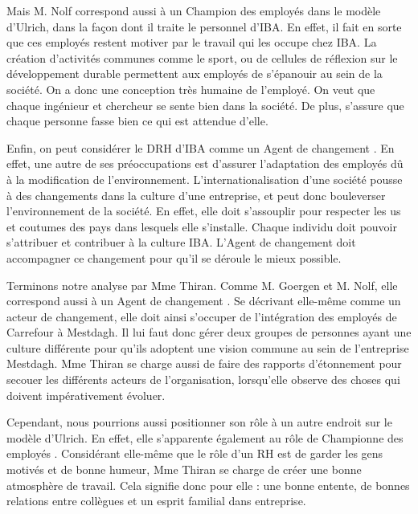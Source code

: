 Mais M. Nolf correspond aussi à un \og Champion des employés \fg{} dans le modèle d'Ulrich, dans la façon dont il traite le personnel d'IBA. En effet, il fait en sorte que ces employés restent motiver par le travail qui les occupe chez IBA. La création d'activités communes comme le sport, ou de cellules de réflexion sur le développement durable permettent aux employés de s'épanouir au sein de la société. On a donc une conception très humaine de l'employé. On veut que chaque ingénieur et chercheur se sente bien dans la société. De plus, s'assure que chaque personne fasse bien ce qui est attendue d'elle. \newline

Enfin, on peut considérer le DRH d'IBA comme un \og{} Agent de changement \fg{}. En effet, une autre de ses préoccupations est d'assurer l'adaptation des employés dû à la modification de l'environnement. L'internationalisation d'une société pousse à des changements dans la culture d'une entreprise, et peut donc bouleverser l'environnement de la société. En effet, elle doit s'assouplir pour respecter les us et coutumes des pays dans lesquels elle s'installe. Chaque individu doit pouvoir s'attribuer et contribuer à la culture IBA. L'\og Agent de changement \fg{} doit accompagner ce changement pour qu'il se déroule le mieux possible. \newline

Terminons notre analyse par Mme Thiran. Comme M. Goergen et M. Nolf, elle correspond aussi à un \og Agent de changement \fg{} . Se décrivant elle-même comme un acteur de changement, elle doit ainsi s'occuper de l'intégration des employés de Carrefour à Mestdagh. Il lui faut donc gérer deux groupes de personnes ayant une culture différente pour qu'ils adoptent une vision commune au sein de l'entreprise Mestdagh. Mme Thiran se charge aussi de faire des rapports d'étonnement pour \og secouer \fg{} les différents acteurs de l'organisation, lorsqu'elle observe des choses qui doivent impérativement évoluer.\newline

Cependant, nous pourrions aussi positionner son rôle à un autre endroit sur le modèle d'Ulrich. En effet, elle s'apparente également au rôle de \og Championne des employés \fg{}. Considérant elle-même que le rôle d'un RH est de garder les gens motivés et de bonne humeur, Mme Thiran se charge de créer une bonne atmosphère de travail. Cela signifie donc pour elle : une bonne entente, de bonnes relations entre collègues et un esprit familial dans entreprise. 

